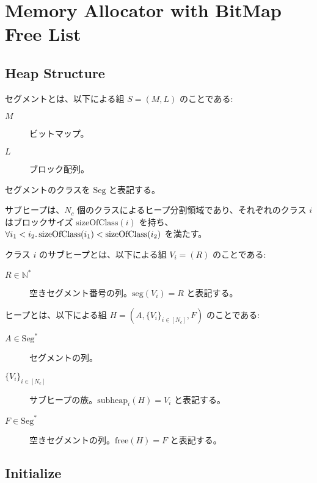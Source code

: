\section{Memory Allocator with BitMap Free List}

\cite{Ueno:2011}\cite{Ueno:2016}

\subsection{Heap Structure}

\begin{definition}
  セグメントとは、以下による組 $S = (M, L)$ のことである:
  \begin{description}
    \item[$M$] ビットマップ。
    \item[$L$] ブロック配列。
  \end{description}
  セグメントのクラスを $\mathrm{Seg}$ と表記する。
\end{definition}

サブヒープは、$N_c$ 個のクラスによるヒープ分割領域であり、それぞれのクラス $i$ はブロックサイズ $\mathrm{sizeOfClass}(i)$ を持ち、$\forall i_1 < i_2\ldotp \mathrm{sizeOfClass}(i_1) < \mathrm{sizeOfClass}(i_2)$ を満たす。
\begin{definition}
  クラス $i$ のサブヒープとは、以下による組 $V_i = (R)$ のことである:
  \begin{description}
    \item[$R \in \mathbb{N}^*$] 空きセグメント番号の列。$\mathrm{seg}(V_i) = R$ と表記する。
  \end{description}
\end{definition}

\begin{definition}
  ヒープとは、以下による組 $H = (A, \{V_i\}_{i \in [N_c]}, F)$ のことである:
  \begin{description}
    \item[$A \in \mathrm{Seg}^*$] セグメントの列。
    \item[$\{V_i\}_{i \in [N_c]}$] サブヒープの族。$\mathrm{subheap}_i(H) = V_i$ と表記する。
    \item[$F \in \mathrm{Seg}^*$] 空きセグメントの列。$\mathrm{free}(H) = F$ と表記する。
  \end{description}
\end{definition}

\subsection{Initialize}

